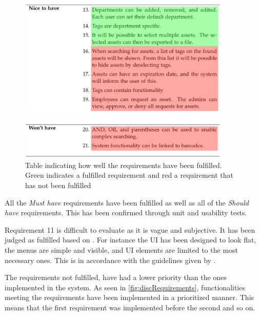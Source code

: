 \begin{figure}[H]
    \centering
    \includegraphics[width=0.9\textwidth]{figures/Requirements/NiceToHave.png}
\end{figure}
\vspace{-10mm}
\begin{figure}[H]
    \centering
    \includegraphics[width=0.9\textwidth]{figures/Requirements/WontHave.png}
    \caption{Table indicating how well the requirements have been fulfilled. Green indicates a fulfilled requirement and red a requirement that has not been fulfilled }
    \label{fig:discRequirements}
\end{figure}

All the \textit{Must have} requirements have been fulfilled as well as all of the \textit{Should have} requirements. This has been confirmed through unit and usability tests.
\par
Requirement 11 is difficult to evaluate as it is vague and subjective. It has been judged as fulfilled based on \citep{MinimalistUX}. For instance the UI has been designed to look flat, the menus are simple and visible, and UI elements are limited to the most necessary ones. This is in accordance with the guidelines given by \citep{MinimalistUX}.
\par
The requirements not fulfilled, have had a lower priority than the ones implemented in the system. As seen in \autoref{fig:discRequirements}, functionalities meeting the requirements have been implemented in a prioritized manner. This means that the first requirement was implemented before the second and so on.